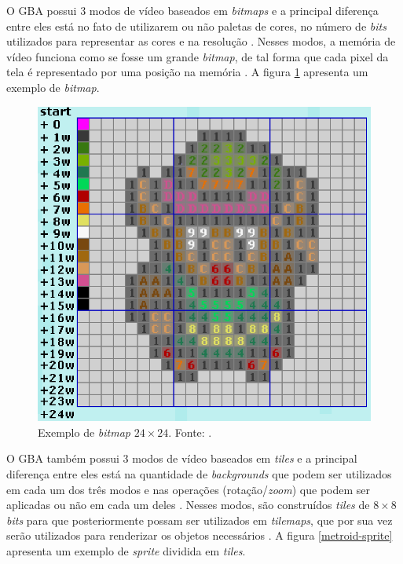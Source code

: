     O GBA possui 3 modos de vídeo baseados em \textit{bitmaps} e a principal diferença entre eles está no fato de utilizarem ou não paletas de cores, no número de \textit{bits} utilizados para representar as cores e na resolução \cite{harbour}. Nesses modos, a memória de vídeo funciona como se fosse um grande \textit{bitmap}, de tal forma que cada pixel da tela é representado por uma posição na memória \cite{tonc}. A figura \ref{link-bitmap} apresenta um exemplo de \textit{bitmap}.

    \begin{figure}[H]
    \centering \includegraphics[keepaspectratio=true,scale=0.6]{figuras/link-bitmap.eps}
      \caption[Exemplo de \textit{bitmap} $24\times24$]
        {Exemplo de \textit{bitmap} $24\times24$. Fonte: \cite{tonc}.}
      \label{link-bitmap}
    \end{figure}

    O GBA também possui 3 modos de vídeo baseados em \textit{tiles} e a principal diferença entre eles está na quantidade de \textit{backgrounds} que podem ser utilizados em cada um dos três modos e nas operações (rotação/\textit{zoom}) que podem ser aplicadas ou não em cada um deles \cite{harbour}. Nesses modos, são construídos \textit{tiles} de $8\times8$ \textit{bits} para que posteriormente possam ser utilizados em \textit{tilemaps}, que por sua vez serão utilizados para renderizar os objetos necessários \cite{tonc}. A figura \ref{metroid-sprite} apresenta um exemplo de \textit{sprite} dividida em \textit{tiles}.

